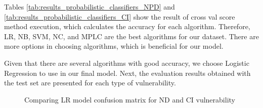 \documentclass[journal,a4paper]{IEEEtran}
\begin{document}

Tables \ref{tab:results_probabilistic_classifiers_NPD}  and \ref{tab:results_probabilistic_classifiers_CI} show the result of cross val score method  execution, which calculates the accuracy for each algorithm. Therefore, LR, NB, SVM, NC, and MPLC are the best algorithms for our dataset. There are more options in choosing algorithms, which is beneficial for our model.

Given that there are several algorithms with good accuracy, we choose Logistic Regression to use in our final model. Next, the evaluation results obtained with the test set are presented for each type of vulnerability.

\begin{figure}
\centering     %
{}
\caption{Comparing LR model confusion matrix for ND and CI vulnerability}
\end{figure}
\end{document}

